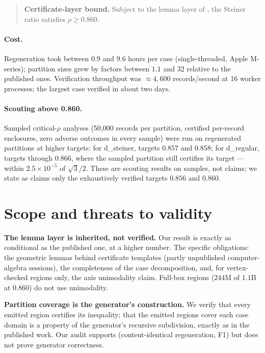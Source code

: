 \documentclass[11pt]{article}
\newcommand{\rr}{\rho}
\begin{document}
\begin{quote}
\textbf{Certificate-layer bound.} Subject to the lemma layer of
\cite{PKU26}, the Steiner ratio satisfies $\rr \ge 0.860$.
\end{quote}

\paragraph{Cost.} Regeneration took between $0.9$ and $9.6$ hours per
case (single-threaded, Apple M-series); partition sizes grew by factors
between $1.1$ and $32$ relative to the published ones. Verification
throughput was $\approx 4{,}600$ records/second at 16 worker processes;
the largest case verified in about two days.

\paragraph{Scouting above 0.860.} Sampled critical-$\rr$ analyses
(50{,}000 records per partition, certified per-record enclosures, zero
adverse outcomes in every sample) were run on regenerated partitions at
higher targets: for d\_steiner, targets $0.857$ and $0.858$; for
d\_regular, targets through $0.866$, where the sampled partition still
certifies its target --- within $2.5 \times 10^{-5}$ of $\sqrt{3}/2$.
These are scouting results on samples, not claims; we state as claims
only the exhaustively verified targets $0.856$ and $0.860$.

\section{Scope and threats to validity}\label{sec:scope}

\textbf{The lemma layer is inherited, not verified.} Our result is
exactly as conditional as the published one, at a higher number. The
specific obligations: the geometric lemmas behind certificate templates
(partly unpublished computer-algebra sessions), the completeness of the
case decomposition, and, for vertex-checked regions only, the axis
unimodality claim. Full-box regions ($244$M of $1.1$B at $0.860$) do
not use unimodality.

\textbf{Partition coverage is the generator's construction.} We verify
that every emitted region certifies its inequality; that the emitted
regions cover each case domain is a property of the generator's
recursive subdivision, exactly as in the published work. Our audit
supports (content-identical regeneration, F1) but does not prove
generator correctness.
\end{document}
